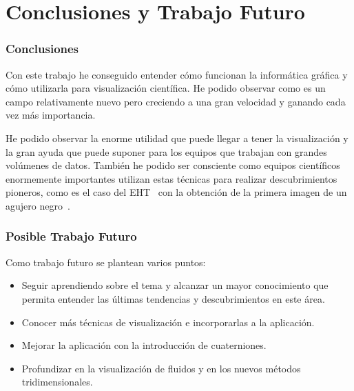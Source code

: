 \cleardoublepage

\chapter{Conclusiones y Trabajo Futuro}
\label{makereference6}

\subsection{Conclusiones}

Con este trabajo he conseguido entender cómo funcionan la informática gráfica y
cómo utilizarla para visualización científica. He podido observar como es un
campo relativamente nuevo pero creciendo a una gran velocidad y ganando cada vez
más importancia.

He podido observar la enorme utilidad que puede llegar a tener la visualización
y la gran ayuda que puede suponer para los equipos que trabajan con grandes
volúmenes de datos. También he podido ser consciente como equipos científicos
enormemente importantes utilizan estas técnicas para realizar descubrimientos
pioneros, como es el caso del EHT~\cite{EHT} con la obtención de la primera imagen
de un agujero negro~\cite{1435174}.

\subsection{Posible Trabajo Futuro}
Como trabajo futuro se plantean varios puntos:

\begin{itemize}

		\item Seguir aprendiendo sobre el tema y alcanzar un mayor
				conocimiento que permita entender las últimas tendencias y
				descubrimientos en este área.

		\item Conocer más técnicas de visualización e incorporarlas a la
				aplicación.

		\item Mejorar la aplicación con la introducción de cuaterniones.

		\item Profundizar en la visualización de fluidos y en los nuevos
				métodos tridimensionales.

\end{itemize}

